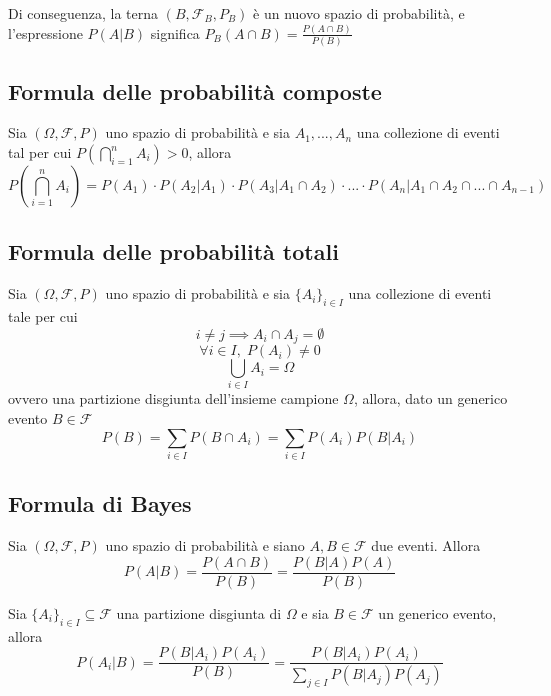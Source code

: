         Di conseguenza, la terna $(B, \mathcal{F}_{B}, P_{B})$ è un nuovo spazio di probabilità, e l'espressione $P(A|B)$ significa $P_{B}(A \cap B) = \displaystyle \frac{P(A \cap B)}{P(B)}$

        \subsection{Formula delle probabilità composte}
            Sia $(\Omega, \mathcal{F}, P)$ uno spazio di probabilità e sia $A_{1}, ..., A_{n}$ una collezione di eventi tal per cui $P(\bigcap_{i = 1}^{n} A_{i}) > 0$, allora
            \[
                P\left(\bigcap_{i = 1}^{n} A_{i}\right) = P(A_{1}) \cdot P(A_{2} | A_{1}) \cdot P(A_{3} | A_{1} \cap A_{2}) \cdot ... \cdot P(A_{n} | A_{1} \cap A_{2} \cap ... \cap A_{n - 1})
            \]

        \subsection{Formula delle probabilità totali}
            Sia $(\Omega, \mathcal{F}, P)$ uno spazio di probabilità e sia $\{A_{i}\}_{i \in I}$ una collezione di eventi tale per cui
            \[
                i \neq j \implies A_{i} \cap A_{j} = \emptyset
            \]
            \[
                \forall i \in I, \; P(A_{i}) \neq 0
            \]
            \[
                \bigcup_{i \in I} A_{i} = \Omega
            \]
            ovvero una partizione disgiunta dell'insieme campione $\Omega$, allora, dato un generico evento $B \in \mathcal{F}$
            \[
                P(B) = \sum_{i \in I} P(B \cap A_{i}) = \sum_{i \in I} P(A_{i})P(B | A_{i})
            \]

        \subsection{Formula di Bayes}
            Sia $(\Omega, \mathcal{F}, P)$ uno spazio di probabilità e siano $A, B \in \mathcal{F}$ due eventi.
            Allora
            \[
                P(A | B) = \frac{P(A \cap B)}{P(B)} = \frac{P(B | A)P(A)}{P(B)}
            \]

            Sia $\{A_{i}\}_{i \in I} \subseteq \mathcal{F}$ una partizione disgiunta di $\Omega$ e sia $B \in \mathcal{F}$ un generico evento, allora
            \[
                P(A_{i} | B) = \frac{P(B | A_{i})P(A_{i})}{P(B)} = \frac{P(B | A_{i})P(A_{i})}{\sum_{j \in I} P(B | A_{j})P(A_{j})}
            \]




